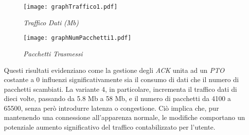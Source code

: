 \begin{figure}[!h]
    \centering
    \begin{minipage}{0.48\textwidth}
        \centering
        \texttt{[image: graphTraffico1.pdf]}
        \caption{\emph{Traffico Dati (Mb)}}
        \label{grafico12}
    \end{minipage}
    \hfill
    \begin{minipage}{0.48\textwidth}
        \centering
        \texttt{[image: graphNumPacchetti1.pdf]}
        \caption{\emph{Pacchetti Trasmessi}}
        \label{grafico1}
    \end{minipage}
\end{figure}
\noindent Questi risultati evidenziano come la gestione degli \emph{ACK} unita ad un \emph{PTO} costante a 0 influenzi significativamente sia il consumo di dati che il numero di pacchetti scambiati.
La variante 4, in particolare, incrementa il traffico dati di dieci volte, passando da 5.8 Mb a 58 Mb, e il numero di pacchetti da 4100 a 65500, senza però introdurre latenza o congestione. 
Ciò implica che, pur mantenendo una connessione all'apparenza normale, le modifiche comportano un potenziale aumento significativo del traffico contabilizzato per l'utente.
